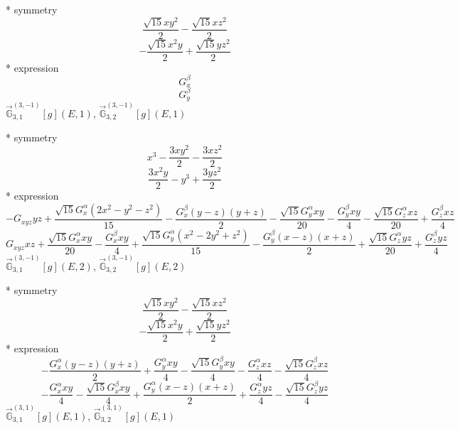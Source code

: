 \documentclass[fleqn,8pt]{jsarticle}
\begin{document}
\noindent\quad ** symmetry
\begin{dmath*}
\frac{\sqrt{15} x y^{2}}{2} - \frac{\sqrt{15} x z^{2}}{2}
\end{dmath*}
\begin{dmath*}
- \frac{\sqrt{15} x^{2} y}{2} + \frac{\sqrt{15} y z^{2}}{2}
\end{dmath*}
\noindent\quad ** expression
\begin{dmath*}
G_{x}^{\beta}
\end{dmath*}
\begin{dmath*}
G_{y}^{\beta}
\end{dmath*}
\noindent\quad $\vec{\mathbb{G}}_{3,1}^{(3,-1)}[g](E,1)$, $\vec{\mathbb{G}}_{3,2}^{(3,-1)}[g](E,1)$

\noindent\quad ** symmetry
\begin{dmath*}
x^{3} - \frac{3 x y^{2}}{2} - \frac{3 x z^{2}}{2}
\end{dmath*}
\begin{dmath*}
\frac{3 x^{2} y}{2} - y^{3} + \frac{3 y z^{2}}{2}
\end{dmath*}
\noindent\quad ** expression
\begin{dmath*}
- G_{xyz} y z + \frac{\sqrt{15} G_{x}^{\alpha} \left(2 x^{2} - y^{2} - z^{2}\right)}{15} - \frac{G_{x}^{\beta} \left(y - z\right) \left(y + z\right)}{2} - \frac{\sqrt{15} G_{y}^{\alpha} x y}{20} - \frac{G_{y}^{\beta} x y}{4} - \frac{\sqrt{15} G_{z}^{\alpha} x z}{20} + \frac{G_{z}^{\beta} x z}{4}
\end{dmath*}
\begin{dmath*}
G_{xyz} x z + \frac{\sqrt{15} G_{x}^{\alpha} x y}{20} - \frac{G_{x}^{\beta} x y}{4} + \frac{\sqrt{15} G_{y}^{\alpha} \left(x^{2} - 2 y^{2} + z^{2}\right)}{15} - \frac{G_{y}^{\beta} \left(x - z\right) \left(x + z\right)}{2} + \frac{\sqrt{15} G_{z}^{\alpha} y z}{20} + \frac{G_{z}^{\beta} y z}{4}
\end{dmath*}
\noindent\quad $\vec{\mathbb{G}}_{3,1}^{(3,-1)}[g](E,2)$, $\vec{\mathbb{G}}_{3,2}^{(3,-1)}[g](E,2)$

\noindent\quad ** symmetry
\begin{dmath*}
\frac{\sqrt{15} x y^{2}}{2} - \frac{\sqrt{15} x z^{2}}{2}
\end{dmath*}
\begin{dmath*}
- \frac{\sqrt{15} x^{2} y}{2} + \frac{\sqrt{15} y z^{2}}{2}
\end{dmath*}
\noindent\quad ** expression
\begin{dmath*}
- \frac{G_{x}^{\alpha} \left(y - z\right) \left(y + z\right)}{2} + \frac{G_{y}^{\alpha} x y}{4} - \frac{\sqrt{15} G_{y}^{\beta} x y}{4} - \frac{G_{z}^{\alpha} x z}{4} - \frac{\sqrt{15} G_{z}^{\beta} x z}{4}
\end{dmath*}
\begin{dmath*}
- \frac{G_{x}^{\alpha} x y}{4} - \frac{\sqrt{15} G_{x}^{\beta} x y}{4} + \frac{G_{y}^{\alpha} \left(x - z\right) \left(x + z\right)}{2} + \frac{G_{z}^{\alpha} y z}{4} - \frac{\sqrt{15} G_{z}^{\beta} y z}{4}
\end{dmath*}
\noindent\quad $\vec{\mathbb{G}}_{3,1}^{(3,1)}[g](E,1)$, $\vec{\mathbb{G}}_{3,2}^{(3,1)}[g](E,1)$
\end{document}
